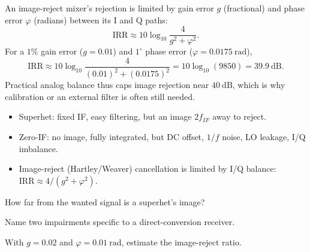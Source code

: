 \begin{workedexample}
An image-reject mixer's rejection is limited by gain error $g$ (fractional)
and phase error $\varphi$ (radians) between its I and Q paths:
\[ \text{IRR} \approx 10\log_{10}\!\frac{4}{g^2 + \varphi^2}. \]
For a $1\%$ gain error ($g = 0.01$) and $1^\circ$ phase error
($\varphi = 0.0175\ \text{rad}$),
\[ \text{IRR} \approx 10\log_{10}\frac{4}{(0.01)^2 + (0.0175)^2} = 10\log_{10}(9850) = 39.9\ \text{dB}. \]
Practical analog balance thus caps image rejection near $40\ \text{dB}$, which is
why calibration or an external filter is often still needed.
\end{workedexample}

\begin{keytakeaways}
\begin{itemize}[leftmargin=1.4em,itemsep=2pt]
\item Superhet: fixed IF, easy filtering, but an image $2f_{IF}$ away to reject.
\item Zero-IF: no image, fully integrated, but DC offset, $1/f$ noise, LO leakage, I/Q imbalance.
\item Image-reject (Hartley/Weaver) cancellation is limited by I/Q balance: $\text{IRR}\approx 4/(g^2+\varphi^2)$.
\end{itemize}
\end{keytakeaways}

\begin{exercises}
\item How far from the wanted signal is a superhet's image?
\item Name two impairments specific to a direct-conversion receiver.
\item With $g = 0.02$ and $\varphi = 0.01\ \text{rad}$, estimate the image-reject ratio.
\end{exercises}


